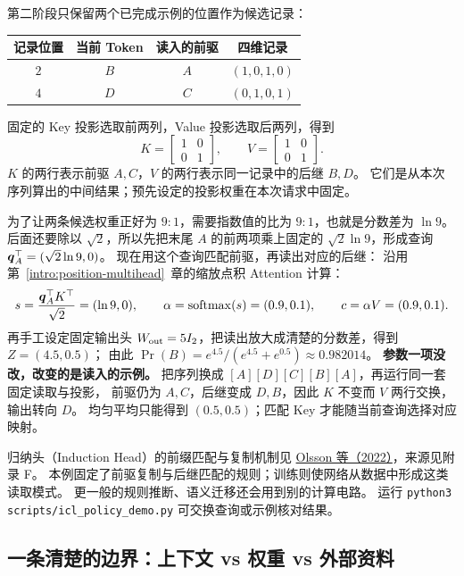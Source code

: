 第二阶段只保留两个已完成示例的位置作为候选记录：
\begin{center}\small
{}
\begin{tabular}{cccc}
\toprule
记录位置 & 当前 Token & 读入的前驱 & 四维记录\\\midrule
$2$ & $B$ & $A$ & $(1,0,1,0)$\\
$4$ & $D$ & $C$ & $(0,1,0,1)$\\
\bottomrule
\end{tabular}
\end{center}
固定的 Key 投影选取前两列，Value 投影选取后两列，得到
\[
K=\begin{bmatrix}1&0\\0&1\end{bmatrix},\qquad
V=\begin{bmatrix}1&0\\0&1\end{bmatrix}.
\]
$K$ 的两行表示前驱 $A,C$，$V$ 的两行表示同一记录中的后继 $B,D$。
它们是从本次序列算出的中间结果；预先设定的投影权重在本次请求中固定。
\par{}
为了让两条候选权重正好为 $9:1$，需要指数值的比为 $9:1$，也就是分数差为 $\ln9$。
后面还要除以 $\sqrt2$，所以先把末尾 $A$ 的前两项乘上固定的 $\sqrt2\ln9$，形成查询
$\boldsymbol{q}_A^\top=(\sqrt2\ln9,0)$。
现在用这个查询匹配前驱，再读出对应的后继：
沿用第~\ref*{intro:position-multihead}~章的缩放点积 Attention 计算：
\[
s=\frac{\boldsymbol{q}_A^\top K^\top}{\sqrt2}=(\ln9,0),\qquad
\alpha=\operatorname{softmax}(s)=(0.9,0.1),\qquad c=\alpha V=(0.9,0.1).
\]
再手工设定固定输出头 $W_{\rm out}=5I_2$，把读出放大成清楚的分数差，得到 $Z=(4.5,0.5)$；
由此
$\Pr(B)=e^{4.5}/(e^{4.5}+e^{0.5})\approx\boxed{0.982014}$。
\textbf{参数一项没改，改变的是读入的示例。}
把序列换成 $[A][D][C][B][A]$，再运行同一套固定读取与投影，
前驱仍为 $A,C$，后继变成 $D,B$，因此 $K$ 不变而 $V$ 两行交换，输出转向 $D$。
均匀平均只能得到 $(0.5,0.5)$；匹配 Key 才能随当前查询选择对应映射。

归纳头（Induction Head）的前缀匹配与复制机制见
\href{https://arxiv.org/abs/2209.11895}{Olsson 等（2022）}，来源见附录 F。
本例固定了前驱复制与后继匹配的规则；训练则使网络从数据中形成这类读取模式。
更一般的规则推断、语义迁移还会用到别的计算电路。
运行 \texttt{python3 scripts/icl\_policy\_demo.py} 可交换查询或示例核对结果。

\subsection{一条清楚的边界：上下文 vs 权重 vs 外部资料}

